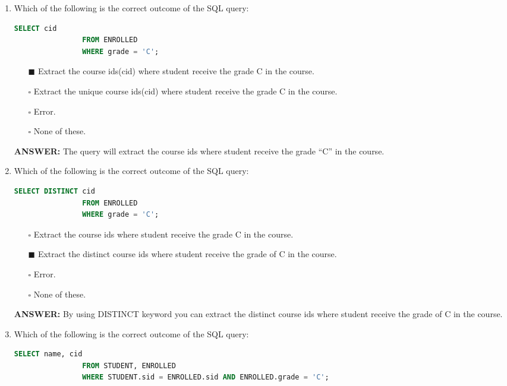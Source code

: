 \documentclass[10pt]{article}
\begin{document}
\begin{enumerate}
		\item Which of the following is the correct outcome of the SQL query: 
			\begin{lstlisting}[language=SQL,firstline=1, lastline=3]
				SELECT cid 
				FROM ENROLLED 
				WHERE grade = 'C';
			\end{lstlisting}

			\begin{enumerate}
				\item[$\blacksquare$] Extract the course ids(cid) where student receive the grade C in the course.
				\item[$\square$] Extract the unique course ids(cid) where student receive the grade C in the course.
				\item[$\square$] Error.
				\item[$\square$] None of these.
			\end{enumerate}
			\color{red} \textbf{ANSWER:} \color{black} The query will extract the course ids where student receive the grade “C” in the course.
			
		\item Which of the following is the correct outcome of the SQL query: 
			\begin{lstlisting}[language=SQL,firstline=1, lastline=3]
				SELECT DISTINCT cid 
				FROM ENROLLED 
				WHERE grade = 'C';
			\end{lstlisting}

			\begin{enumerate}
				\item[$\square$] Extract the course ids where student receive the grade C in the course.
				\item[$\blacksquare$] Extract the distinct course ids where student receive the grade of C in the course.
				\item[$\square$] Error.
				\item[$\square$] None of these.
			\end{enumerate}
			\color{red} \textbf{ANSWER:} \color{black} By using DISTINCT keyword you can extract the distinct course ids where student receive the grade of C in the course.
		
		\newpage

		\item Which of the following is the correct outcome of the SQL query: 
			\begin{lstlisting}[language=SQL,firstline=1, lastline=3]
				SELECT name, cid 
				FROM STUDENT, ENROLLED 
				WHERE STUDENT.sid = ENROLLED.sid AND ENROLLED.grade = 'C';
			\end{lstlisting}
		

\end{enumerate}
\end{document}
